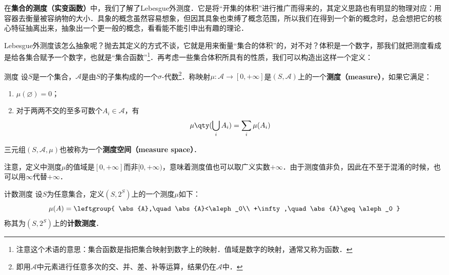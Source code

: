 

在\textbf{集合的测度（实变函数）}中，我们了解了Lebesgue外测度．它是将“开集的体积”进行推广而得来的，其定义思路也有明显的物理对应：用容器去衡量被容纳物的大小．具象的概念虽然容易想象，但因其具象也束缚了概念范围，所以我们在得到一个新的概念时，总会想把它的核心特征抽离出来，抽象出一个更一般的概念，看看能不能引申出有趣的理论．

Lebesgue外测度该怎么抽象呢？抛去其定义的方式不谈，它就是用来衡量“集合的体积”的，对不对？体积是一个数字，那我们就把测度看成是给各集合赋予一个数字，也就是“集合函数”\footnote{注意这个术语的意思：集合函数是指把集合映射到数字上的映射．值域是数字的映射，通常又称为函数．}．再考虑一些集合体积所具有的性质，我们可以构造出这样一个定义：

\begin{definition}{测度}\label{GenFun_def1}
设$S$是一个集合，$\mathcal{A}$是由$S$的子集构成的一个$\sigma$-代数\footnote{即用$\mathcal{A}$中元素进行任意多次的交、并、差、补等运算，结果仍在$\mathcal{A}$中．}．称映射$\mu:\mathcal{A}\to [0, +\infty]$是$(S, \mathcal{A})$上的一个\textbf{测度（measure）}，如果它满足：
\begin{enumerate}
\item $\mu(\varnothing)=0$；\\
\item 对于两两不交的至多可数个$A_i\in\mathcal{A}$，有
\begin{equation}
\mu\qty(\bigcup_i A_i) = \sum_i \mu(A_i)
\end{equation}
\end{enumerate}

三元组$(S, \mathcal{A}, \mu)$也被称为一个\textbf{测度空间（measure space）}．

\end{definition}

注意，定义中测度$\mu$的值域是$[0, +\infty]$而非$[0, +\infty)$，意味着测度值也可以取广义实数$+\infty$．由于测度值非负，因此在不至于混淆的时候，也可以用$\infty$代替$+\infty$．

\begin{example}{计数测度}
设$S$为任意集合，定义$(S, 2^S)$上的一个测度$\mu$如下：
\begin{equation}
\mu(A)=
\leftgroup{
    \abs{A},\quad \abs{A}<\aleph_0\\
    +\infty,\quad \abs{A}\geq\aleph_0
}
\end{equation}
称其为$(S, 2^S)$上的\textbf{计数测度}．
\end{example}

